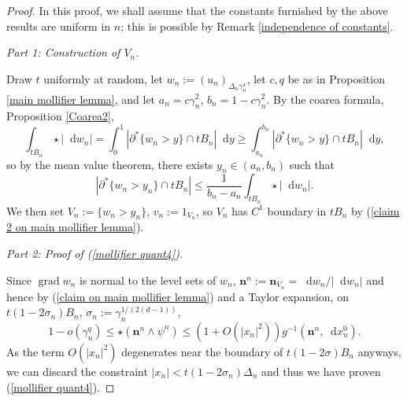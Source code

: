 \documentclass[reqno,12pt,letterpaper]{amsart}
\newcommand*\dif{\mathop{}\!\mathrm{d}}
\DeclareMathOperator{\grad}{grad}
\newcommand{\normal}{\mathbf n}
\theoremstyle{definition}
\newcommand{\proofpart}[2]{%
  \par
  \addvspace{\medskipamount}%
  \noindent\emph{Part #1: #2.}
}
\numberwithin{equation}{section}
\begin{document}
\begin{proof}
In this proof, we shall assume that the constants furnished by the above results are uniform in $n$; this is possible by Remark \ref{independence of constants}.

\proofpart{1}{Construction of $V_n$}
Draw $t$ uniformly at random, let $w_n := (u_n)_{\Delta_n \gamma_n^4}$, let $c, q$ be as in Proposition \ref{main mollifier lemma}, and let $a_n = c\gamma_n^2$, $b_n = 1 - c\gamma_n^2$.
By the coarea formula, Proposition \ref{Coarea2},
$$\int_{tB_n} \star |\dif w_n| = \int_0^1 |\partial^* \{w_n > y\} \cap tB_n| \dif y \geq \int_{a_n}^{b_n} |\partial^* \{w_n > y\} \cap tB_n| \dif y,$$
so by the mean value theorem, there exists $y_n \in (a_n, b_n)$ such that
\begin{equation}\label{MVT mollifier}
|\partial^* \{w_n > y_n\} \cap tB_n| \leq \frac{1}{b_n - a_n} \int_{tB_n} \star |\dif w_n|.
\end{equation}
We then set $V_n := \{w_n > y_n\}$, $v_n := 1_{V_n}$, so $V_n$ has $C^1$ boundary in $tB_n$ by (\ref{claim 2 on main mollifier lemma}).

\proofpart{2}{Proof of (\ref{mollifier quant4})}
Since $\grad w_n$ is normal to the level sets of $w_n$, $\normal^n := \normal_{V_n} = \dif w_n/|\dif w_n|$ and hence by (\ref{claim on main mollifier lemma}) and a Taylor expansion, on $t(1 - 2\sigma_n)B_n$, $\sigma_n := \gamma_n^{1/(2(d - 1))}$,
$$1 - o(\gamma^q_n) \leq \star(\normal^n \wedge \psi^n) \leq (1 + O(|x_n|^2)) g^{-1}(\normal^n, \dif x_n^0).$$
As the term $O(|x_n|^2)$ degenerates near the boundary of $t(1 - 2\sigma)B_n$ anyways, we can discard the constraint $|x_n| < t(1 - 2\sigma_n)\Delta_n$ and thus we have proven (\ref{mollifier quant4}).


\end{proof}
\end{document}

